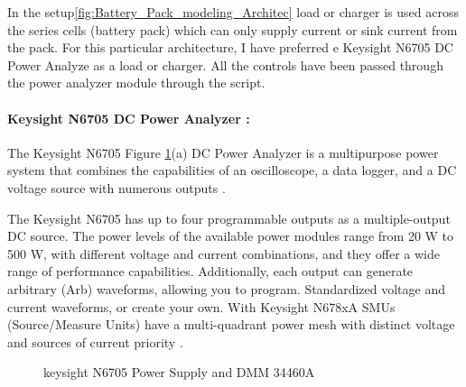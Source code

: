 In the setup\ref{fig:Battery_Pack_modeling_Architec} load or charger is used across the series cells (battery pack) which can only supply current or sink current from the pack. For this particular architecture, I have preferred e Keysight N6705 DC Power Analyze as a load or charger. All the controls have been passed through the power analyzer module through the script.

\paragraph{ Keysight N6705 DC Power Analyzer :}

The Keysight N6705 Figure \ref{fig:keysight_n6705_DMM_34460A}(a) DC Power Analyzer is a multipurpose power system that combines the capabilities of an oscilloscope, a data logger, and a DC voltage source with numerous outputs \cite{Keysight_N6705_DC_Power_Analyzer}.

The Keysight N6705 has up to four programmable outputs as a multiple-output DC source. The power levels of the available power modules range from 20 W to 500 W, with different voltage and current combinations, and they offer a wide range of performance capabilities. Additionally, each output can generate arbitrary (Arb) waveforms, allowing you to program. Standardized voltage and current waveforms, or create your own. With Keysight N678xA SMUs (Source/Measure Units) have a multi-quadrant power mesh with distinct voltage and sources of current priority \cite{Keysight_N6705_DC_Power_Analyzer}.

\begin{figure}[h]
	\centering
    \qquad
	\caption{ keysight N6705 Power Supply and DMM 34460A }
	\label{fig:keysight_n6705_DMM_34460A}
\end{figure}

